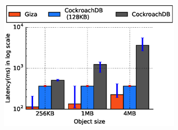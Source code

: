 \begin{figure}[t]
    \begin{subfigure}{0.45\textwidth}
      \includegraphics[width=\linewidth]{plots/giza_cock_put}


\end{subfigure}
\end{figure}
